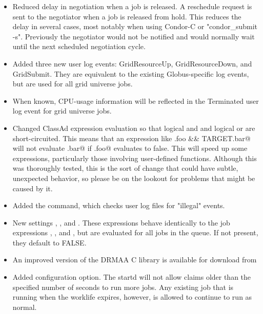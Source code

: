 \begin{itemize}
\item Reduced delay in negotiation when a job is released.  A reschedule
request is sent to the negotiator when a job is released from hold.  This
reduces the delay in several cases, most notably when using Condor-C or
"condor\_submit -s".  Previously the negotiator would not be notified and
would normally wait until the next scheduled negotiation cycle.

\item Added three new user log events: GridResourceUp, GridResourceDown,
and GridSubmit. They are equivalent to the existing Globus-specific log
events, but are used for all grid universe jobs.

\item When known, CPU-usage information will be reflected in the Terminated
user log event for grid universe jobs.

\item Changed ClassAd expression evaluation so that logical and and
logical or are short-circuited. This means that an expression like
\verb@TARGET.foo && TARGET.bar@ will not evaluate \verb@TARGET.bar@
if \verb@TARGET.foo@ evaluates to false. This will speed up some
expressions, particularly those involving user-defined
functions. Although this was thoroughly tested, this is the sort of
change that could have subtle, unexpected behavior, so please be on
the lookout for problems that might be caused by it. 

\item Added the  command, which checks user log
files for "illegal" events.

\item New settings
,
, and
.
These expressions behave identically to the job expressions
,
, and
, but are evaluated for all jobs in the
queue.  If not present, they default to FALSE.

\item An improved version of the DRMAA C library is available for download from

\item Added  configuration option.  The startd
will not allow claims older than the specified number of seconds to
run more jobs.  Any existing job that is running when the worklife expires,
however, is allowed to continue to run as normal.

\end{itemize}

